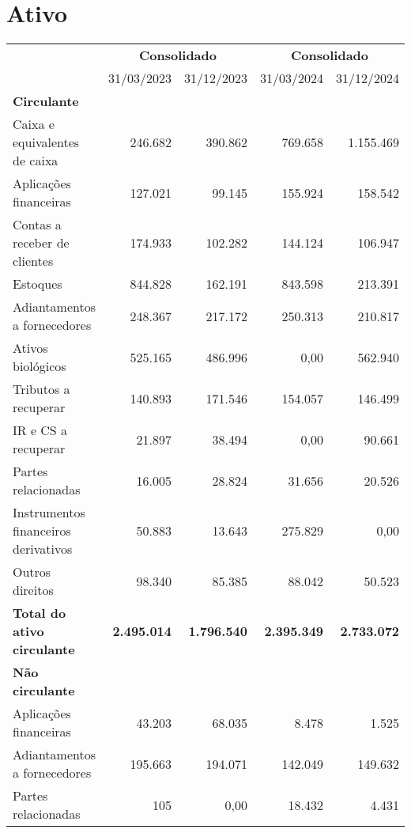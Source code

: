 \documentclass[1pt,a4paper]{article}
\begin{document}
		
		
		\centering\section*{Ativo}
		\begin{longtable}{p{6cm}r r r r }
			\toprule
			& \multicolumn{2}{c}{\textbf{Consolidado}} & \multicolumn{2}{c}{\textbf{Consolidado}} \\
			\cmidrule(lr){2-3} \cmidrule(lr){4-5}
			& 31/03/2023 & 31/12/2023 & 31/03/2024 & 31/12/2024 \\
			\midrule
			\endhead
			\textbf{Circulante} & & & & \\
			Caixa e equivalentes de caixa & 246.682 & 390.862 & 769.658 & 1.155.469 \\
			Aplicações financeiras & 127.021 & 99.145 & 155.924 & 158.542 \\
			Contas a receber de clientes & 174.933 & 102.282 & 144.124 & 106.947 \\
			Estoques & 844.828 & 162.191 & 843.598 & 213.391 \\
			Adiantamentos a fornecedores & 248.367 & 217.172 & 250.313 & 210.817 \\
			Ativos biológicos & 525.165 & 486.996 & 0,00 & 562.940 \\
			Tributos a recuperar & 140.893 & 171.546 & 154.057 & 146.499 \\
			IR e CS a recuperar & 21.897 & 38.494 & 0,00 & 90.661 \\
			Partes relacionadas & 16.005 & 28.824 & 31.656 & 20.526 \\
			Instrumentos financeiros derivativos & 50.883 & 13.643 & 275.829 & 0,00 \\
			Outros direitos & 98.340 & 85.385 & 88.042 & 50.523 \\
			\rowcolor{darkgray}\textbf{Total do ativo circulante} & \textbf{2.495.014} & \textbf{1.796.540} & \textbf{2.395.349} & \textbf{2.733.072} \\
			\midrule
			\textbf{Não circulante} & & & & \\
			Aplicações financeiras & 43.203 & 68.035& 8.478 & 1.525 \\
			Adiantamentos a fornecedores & 195.663 & 194.071 & 142.049 & 149.632 \\
			Partes relacionadas & 105 & 0,00 & 18.432 & 4.431 \\

\end{longtable}
\end{document}
